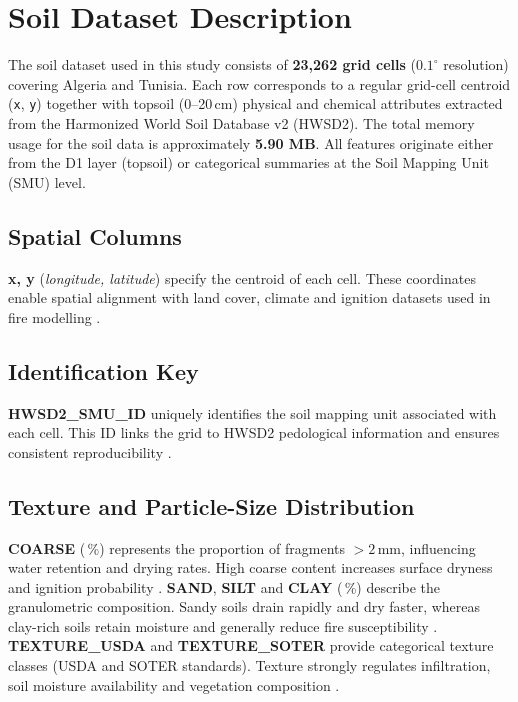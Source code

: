 \section{Soil Dataset Description}

The soil dataset used in this study consists of \textbf{23,262 grid cells}
($0.1^{\circ}$ resolution) covering Algeria and Tunisia. Each row corresponds to a
regular grid-cell centroid (\texttt{x}, \texttt{y}) together with topsoil
(0--20\,cm) physical and chemical attributes extracted from the Harmonized World
Soil Database v2 (HWSD2). The total memory usage for the soil data is approximately \textbf{5.90 MB}. All features originate either from the D1 layer
(topsoil) or categorical summaries at the Soil Mapping Unit (SMU) level.

\subsection*{Spatial Columns}
\textbf{x, y} (\textit{longitude, latitude}) specify the centroid of each cell.
These coordinates enable spatial alignment with land cover, climate and
ignition datasets used in fire modelling \citep{Giglio2013}.

\subsection*{Identification Key}
\textbf{HWSD2\_SMU\_ID} uniquely identifies the soil mapping unit associated with
each cell. This ID links the grid to HWSD2 pedological information and ensures
consistent reproducibility \citep{FAO2021}.

\subsection*{Texture and Particle-Size Distribution}
\textbf{COARSE} (\,\%) represents the proportion of fragments $>2$\,mm, influencing
water retention and drying rates. High coarse content increases surface dryness
and ignition probability \citep{Prieto2019}.  
\textbf{SAND}, \textbf{SILT} and \textbf{CLAY} (\,\%) describe the granulometric
composition. Sandy soils drain rapidly and dry faster, whereas clay-rich soils
retain moisture and generally reduce fire susceptibility
\citep{Bowman2009,Saatchi2012}.  
\textbf{TEXTURE\_USDA} and \textbf{TEXTURE\_SOTER} provide categorical texture
classes (USDA and SOTER standards). Texture strongly regulates infiltration,
soil moisture availability and vegetation composition \citep{USDA2017,Batjes2016}.


